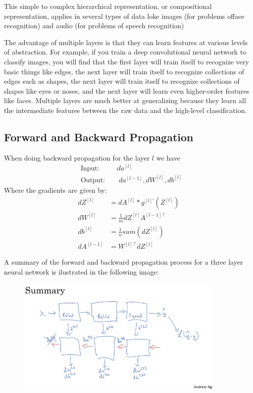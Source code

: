 This simple to complex hierarchical representation, or compositional representation, 
applies in several types of data loke images (for problems offace recognition) and 
audio (for problems of speech recognition)

The advantage of multiple layers is that they can learn features at various levels of 
abstraction. For example, if you train a deep convolutional neural network to classify 
images, you will find that the first layer will train itself to recognize very basic 
things like edges, the next layer will train itself to recognize collections of edges 
such as shapes, the next layer will train itself to recognize collections of shapes like 
eyes or noses, and the next layer will learn even higher-order features like faces. 
Multiple layers are much better at generalizing because they learn all the intermediate 
features between the raw data and the high-level classification.
\newpage
\subsection*{Forward and Backward Propagation}

When doing backward propagation for the layer $l$ we have
\begin{align*}
    &\text{Input: } \ \quad \quad da^{[l]} \\
    &\text{Output:} \quad \quad da^{[l-1]}, dW^{[l]}, db^{[l]}
\end{align*}
Where the gradients are given by:
\begin{align*}
    dZ^{[l]} &= dA^{[l]} * g^{[l]'} (Z^{[l]}) \\
    dW^{[l]} &= \frac{1}{m} dZ^{[l]} A^{[l-1]\top} \\
    db^{[l]} &= \frac{1}{n} sum(dZ^{[l]}) \\ 
    dA^{[l-1]} &= W^{[l]\top} dZ^{[l]}
\end{align*}

A summary of the forward and backward propagation process for a three layer neural 
network is ilustrated in the following image:

\begin{figure}[H]
    \begin{center}
            \includegraphics[width=0.9\textwidth]{img/summary.jpg}
        \end{center}
\end{figure}

